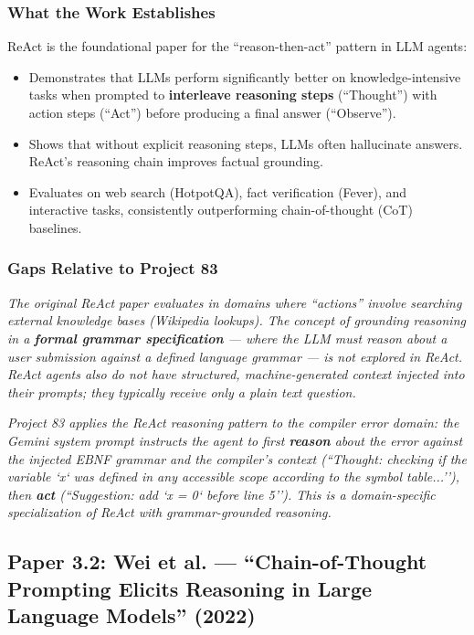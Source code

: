 \documentclass[a4paper,11pt]{article}
\newcommand{\papergap}[1]{%
  \begin{tcolorbox}[colback=red!5!white, colframe=red!60!black, title={Research Gap Identified}]
  \textit{#1}
  \end{tcolorbox}
}
\newcommand{\oursolution}[1]{%
  \begin{tcolorbox}[colback=green!5!white, colframe=green!60!black, title={How Project 83 Solves This Gap}]
  \textit{#1}
  \end{tcolorbox}
}
\begin{document}
\subsubsection{What the Work Establishes}

ReAct is the foundational paper for the ``reason-then-act'' pattern in LLM agents:
\begin{itemize}
    \item Demonstrates that LLMs perform significantly better on knowledge-intensive tasks when prompted to \textbf{interleave reasoning steps} (``Thought'') with action steps (``Act'') before producing a final answer (``Observe'').
    \item Shows that without explicit reasoning steps, LLMs often hallucinate answers. ReAct's reasoning chain improves factual grounding.
    \item Evaluates on web search (HotpotQA), fact verification (Fever), and interactive tasks, consistently outperforming chain-of-thought (CoT) baselines.
\end{itemize}

\subsubsection{Gaps Relative to Project 83}

\papergap{The original ReAct paper evaluates in domains where ``actions'' involve searching external knowledge bases (Wikipedia lookups). The concept of grounding reasoning in a \textbf{formal grammar specification} --- where the LLM must reason about a user submission \textit{against a defined language grammar} --- is not explored in ReAct. ReAct agents also do not have structured, machine-generated context injected into their prompts; they typically receive only a plain text question.}

\oursolution{Project 83 applies the ReAct reasoning pattern to the compiler error domain: the Gemini system prompt instructs the agent to first \textbf{reason} about the error against the injected EBNF grammar and the compiler's context (``Thought: checking if the variable `x` was defined in any accessible scope according to the symbol table...''), then \textbf{act} (``Suggestion: add `x = 0` before line 5''). This is a domain-specific specialization of ReAct with grammar-grounded reasoning.}

\subsection{Paper 3.2: Wei et al. --- ``Chain-of-Thought Prompting Elicits Reasoning in Large Language Models'' (2022)}
\end{document}
